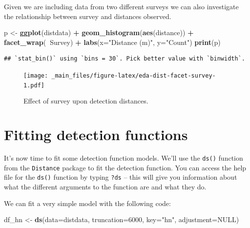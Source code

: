 \documentclass[]{book}
\newenvironment{Shaded}{\begin{snugshade}}{\end{snugshade}}
\newcommand{\KeywordTok}[1]{\textcolor[rgb]{0.13,0.29,0.53}{\textbf{#1}}}
\newcommand{\DataTypeTok}[1]{\textcolor[rgb]{0.13,0.29,0.53}{#1}}
\newcommand{\DecValTok}[1]{\textcolor[rgb]{0.00,0.00,0.81}{#1}}
\newcommand{\StringTok}[1]{\textcolor[rgb]{0.31,0.60,0.02}{#1}}
\newcommand{\OtherTok}[1]{\textcolor[rgb]{0.56,0.35,0.01}{#1}}
\newcommand{\OperatorTok}[1]{\textcolor[rgb]{0.81,0.36,0.00}{\textbf{#1}}}
\newcommand{\NormalTok}[1]{#1}
\theoremstyle{definition}
\theoremstyle{definition}
\theoremstyle{remark}
\begin{document}
Given we are including data from two different surveys we can also
investigate the relationship between survey and distances observed.

\begin{Shaded}
\begin{Highlighting}[]
\NormalTok{p <-}\StringTok{ }\KeywordTok{ggplot}\NormalTok{(distdata) }\OperatorTok{+}
\StringTok{      }\KeywordTok{geom_histogram}\NormalTok{(}\KeywordTok{aes}\NormalTok{(distance)) }\OperatorTok{+}
\StringTok{      }\KeywordTok{facet_wrap}\NormalTok{(}\OperatorTok{~}\NormalTok{Survey) }\OperatorTok{+}
\StringTok{      }\KeywordTok{labs}\NormalTok{(}\DataTypeTok{x=}\StringTok{"Distance (m)"}\NormalTok{, }\DataTypeTok{y=}\StringTok{"Count"}\NormalTok{)}
\KeywordTok{print}\NormalTok{(p)}
\end{Highlighting}
\end{Shaded}

\begin{verbatim}
## `stat_bin()` using `bins = 30`. Pick better value with `binwidth`.
\end{verbatim}

\begin{figure}
\centering
\texttt{[image: \_main\_files/figure-latex/eda-dist-facet-survey-1.pdf]}
\caption{\label{fig:eda-dist-facet-survey}Effect of survey upon detection
distances.}
\end{figure}

\section{Fitting detection functions}\label{fitting-detection-functions}

It's now time to fit some detection function models. We'll use the
\texttt{ds()} function from the \texttt{Distance} package to fit the
detection function. You can access the help file for the \texttt{ds()}
function by typing \texttt{?ds} -- this will give you information about
what the different arguments to the function are and what they do.

We can fit a very simple model with the following code:

\begin{Shaded}
\begin{Highlighting}[]
\NormalTok{df_hn <-}\StringTok{ }\KeywordTok{ds}\NormalTok{(}\DataTypeTok{data=}\NormalTok{distdata, }\DataTypeTok{truncation=}\DecValTok{6000}\NormalTok{, }\DataTypeTok{key=}\StringTok{"hn"}\NormalTok{, }\DataTypeTok{adjustment=}\OtherTok{NULL}\NormalTok{)}
\end{Highlighting}
\end{Shaded}
\end{document}
